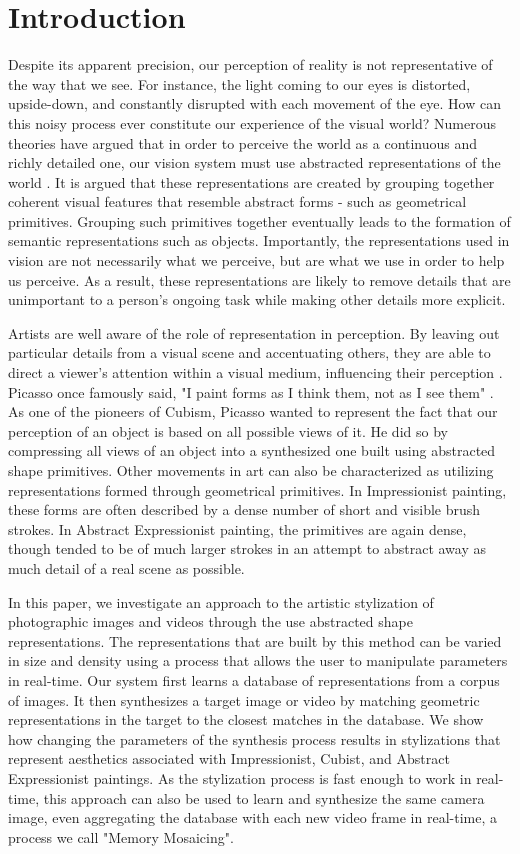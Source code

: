 \documentclass[a4paper,10pt,final]{ThesisStyle}
\begin{document}
\section{Introduction}  
Despite its apparent precision, our perception of reality is not representative of the way that we see.  For instance, the light coming to our eyes is distorted, upside-down, and constantly disrupted with each movement of the eye.  How can this noisy process ever constitute our experience of the visual world?  Numerous theories have argued that in order to perceive the world as a continuous and richly detailed one, our vision system must use abstracted representations of the world \cite{Marr1982}.  It is argued that these representations are created by grouping together coherent visual features that resemble abstract forms - such as geometrical primitives. Grouping such primitives together eventually leads to the formation of semantic representations such as objects. Importantly, the representations used in vision are not necessarily what we perceive, but are what we use in order to help us perceive. As a result, these representations are likely to remove details that are unimportant to a person's ongoing task while making other details more explicit.

Artists are well aware of the role of representation in perception.  By leaving out particular details from a visual scene and accentuating others, they are able to direct a viewer's attention within a visual medium, influencing their perception \cite{Haeberli1990,Zimmer2003}.  Picasso once famously said, "I paint forms as I think them, not as I see them" \cite{Hughes1991}.  As one of the pioneers of Cubism, Picasso wanted to represent the fact that our perception of an object is based on all possible views of it.  He did so by compressing all views of an object into a synthesized one built using abstracted shape primitives.  Other movements in art can also be characterized as utilizing representations formed through geometrical primitives.  In Impressionist painting, these forms are often described by a dense number of short and visible brush strokes.  In Abstract Expressionist painting, the primitives are again dense, though tended to be of much larger strokes in an attempt to abstract away as much detail of a real scene as possible.

In this paper, we investigate an approach to the artistic stylization of photographic images and videos through the use abstracted shape representations.  The representations that are built by this method can be varied in size and density using a process that allows the user to manipulate parameters in real-time.  Our system first learns a database of representations from a corpus of images.  It then synthesizes a target image or video by matching geometric representations in the target to the closest matches in the database.  We show how changing the parameters of the synthesis process results in stylizations that represent aesthetics associated with Impressionist, Cubist, and Abstract Expressionist paintings.  As the stylization process is fast enough to work in real-time, this approach can also be used to learn and synthesize the same camera image, even aggregating the database with each new video frame in real-time, a process we call "Memory Mosaicing".  
\end{document}
